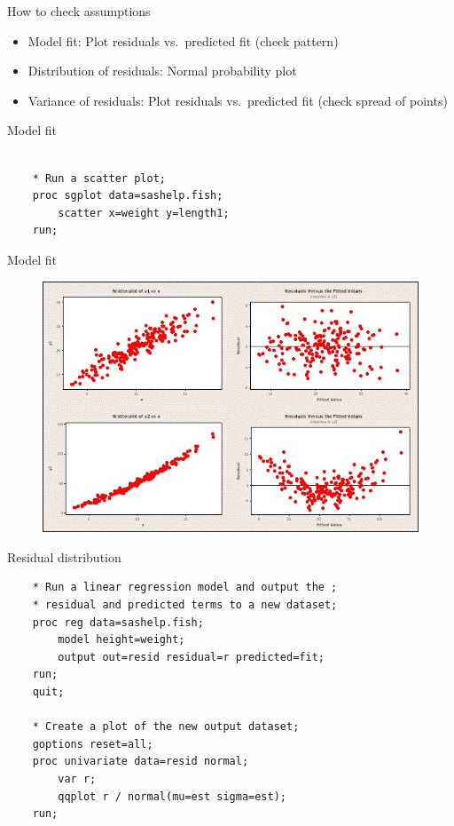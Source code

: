\documentclass[ignorenonframetext,xcolor=dvipsnames]{beamer}
\begin{document}
\begin{frame}{How to check assumptions}

\begin{itemize}
\item
  Model fit: Plot residuals vs.~predicted fit (check pattern)
\item
  Distribution of residuals: Normal probability plot
\item
  Variance of residuals: Plot residuals vs.~predicted fit (check spread
  of points)
\end{itemize}

\end{frame}

\begin{frame}[fragile]{Model fit}

\begin{verbatim}

    * Run a scatter plot;
    proc sgplot data=sashelp.fish;
        scatter x=weight y=length1;
    run;
\end{verbatim}

\end{frame}

\begin{frame}{Model fit}

\begin{figure}[htbp]
\centering
\includegraphics{img/modelFit.jpg}
\caption{}
\end{figure}

\end{frame}

\begin{frame}[fragile]{Residual distribution}

\begin{verbatim}
    * Run a linear regression model and output the ;
    * residual and predicted terms to a new dataset;
    proc reg data=sashelp.fish;
        model height=weight;
        output out=resid residual=r predicted=fit;
    run;
    quit;

    * Create a plot of the new output dataset;
    goptions reset=all;
    proc univariate data=resid normal;
        var r;
        qqplot r / normal(mu=est sigma=est);
    run;
\end{verbatim}

\end{frame}
\end{document}

